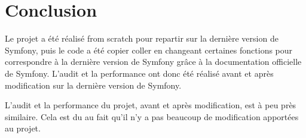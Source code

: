 \documentclass{article}
\theoremstyle{definition}
\theoremstyle{remark}
\begin{document}







\newpage
\section*{Conclusion}

Le projet a été réalisé from scratch pour repartir sur la dernière version de Symfony, puis le code a été copier coller en changeant certaines fonctions pour correspondre à la dernière version de Symfony grâce à la documentation officielle de Symfony. L'audit et la performance ont donc été réalisé avant et après modification sur la dernière version de Symfony.

L'audit et la performance du projet, avant et après modification, est à peu près similaire. Cela est du au fait qu'il n'y a pas beaucoup de modification apportées au projet. 










\end{document}
